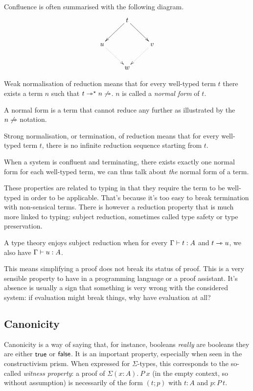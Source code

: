 Confluence is often summarised with the following diagram.
\[
  \xymatrix{
    & t \ar[ld] \ar[rd] & \\
    u \ar@{.>}[rd] && v \ar@{.>}[ld] \\
    & w &
  }
\]

\begin{definition}
  Weak normalisation of reduction means that for every well-typed term \(t\)
  there exists a term \(n\) such that \(t \rightarrowtriangle^{\star} n \not\rightarrowtriangle\).
  \(n\) is called a \emph{normal form} of \(t\).
\end{definition}

A normal form is a term that cannot reduce any further as illustrated by the
\(n \not\rightarrowtriangle\) notation.

\begin{definition}
  Strong normalisation, or termination, of reduction means that for every
  well-typed term \(t\), there is no infinite reduction sequence starting from
  \(t\).
\end{definition}

When a system is confluent and terminating, there exists exactly one normal form
for each well-typed term, we can thus talk about \emph{the} normal form of a
term.

These properties are related to typing in that they require the term to be
well-typed in order to be applicable. That's because it's too easy to break
termination with non-sensical terms.
There is however a reduction property that is much more linked to typing:
subject reduction, sometimes called type safety or type preservation.

\begin{definition}
  A type theory enjoys subject reduction when for every \(\Gamma \vdash t : A\)
  and \(t \rightarrowtriangle u\), we also have \(\Gamma \vdash u : A\).
\end{definition}

This means simplifying a proof does not break its status of proof. This is a
very sensible property to have in a programming language or a proof assistant.
It's absence is usually a sign that something is very wrong with the considered
system: if evaluation might break things, why have evaluation at all?

\subsection{Canonicity}

Canonicity is a way of saying that, for instance, booleans \emph{really} are
booleans \ie they are either \(\mathsf{true}\) or \(\mathsf{false}\).
It is an important property, especially when seen in the constructivism prism.
When expressed for \(\Sigma\)-types, this corresponds to the so-called
\emph{witness property}: a proof of \(\Sigma (x:A).\ P\ x\) (in the empty
context, so without assumption) is necessarily of the form \((t;p)\)
with \(t : A\) and \(p : P\ t\).

